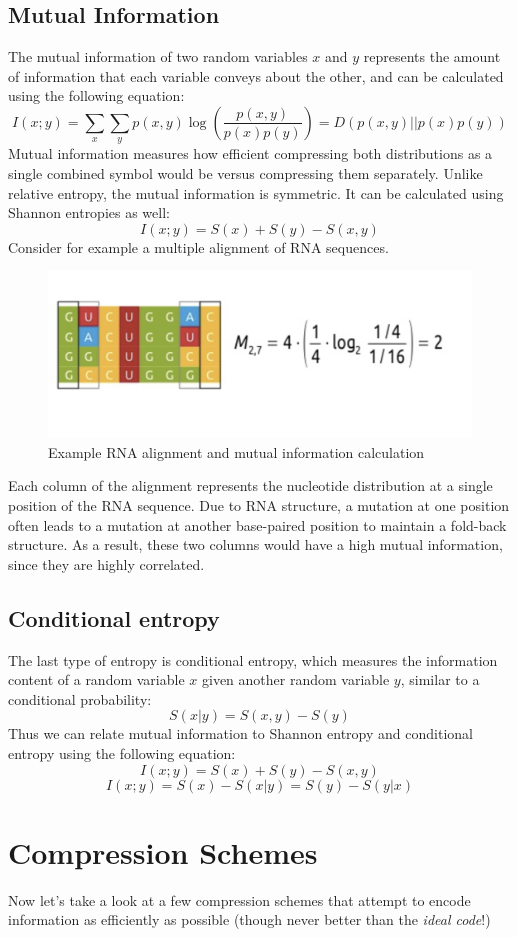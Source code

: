 \documentclass[12pt]{article}
\begin{document}
\subsection{Mutual Information}
The mutual information of two random variables $x$ and $y$ represents the amount of information that each variable conveys about the other, and can be calculated using the following equation:
$$I(x;y) = \sum_x\sum_yp(x,y)\log\left(\frac{p(x,y)}{p(x)p(y)}\right) = D(p(x,y)||p(x)p(y))$$
Mutual information measures how efficient compressing both distributions as a single combined symbol would be versus compressing them separately. Unlike relative entropy, the mutual information is symmetric. It can be calculated using Shannon entropies as well:
$$I(x;y) = S(x) + S(y) - S(x,y)$$
Consider for example a multiple alignment of RNA sequences. 
\begin{figure}[h]
    \centering
    \includegraphics[width = .7\linewidth]{mutual.png}
    \caption{Example RNA alignment and mutual information calculation}
    \label{fig:mutual}
\end{figure}
Each column of the alignment represents the nucleotide distribution at a single position of the RNA sequence. Due to RNA structure, a mutation at one position often leads to a mutation at another base-paired position to maintain a fold-back structure. As a result, these two columns would have a high mutual information, since they are highly correlated.
\subsection{Conditional entropy}
The last type of entropy is conditional entropy, which measures the information content of a random variable $x$ given another random variable $y$, similar to a conditional probability:
$$S(x|y) = S(x,y) - S(y)$$
Thus we can relate mutual information to Shannon entropy and conditional entropy using the following equation:
$$I(x;y) = S(x) + S(y) - S(x,y)$$
$$I(x;y) = S(x) - S(x|y) = S(y) - S(y|x)$$

\section{Compression Schemes}
Now let's take a look at a few compression schemes that attempt to encode information as efficiently as possible (though never better than the \textit{ideal code}!)
\end{document}
